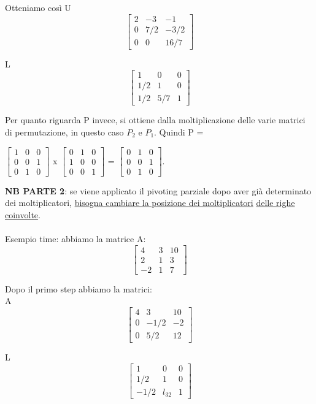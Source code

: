 Otteniamo così U 
$$
\begin{bmatrix}
2 & -3 & -1 \\
0 & 7/2 & -3/2 \\
0 & 0 & 16/7 
\end{bmatrix}
$$

L
$$
\begin{bmatrix}
1 & 0 & 0 \\
1/2 & 1 & 0 \\
1/2 & 5/7 & 1 
\end{bmatrix}
$$

Per quanto riguarda P invece, si ottiene dalla moltiplicazione delle varie matrici di permutazione, in questo caso $P_2$ e $P_1$. Quindi P = \\
\begin{center}
$
\begin{bmatrix}
1 & 0 & 0 \\
0 & 0 & 1 \\
0 & 1 & 0 
\end{bmatrix}
$
x
$
\begin{bmatrix}
0 & 1 & 0 \\
1 & 0 & 0 \\
0 & 0 & 1 
\end{bmatrix}
$
=
$
\begin{bmatrix}
0 & 1 & 0 \\
0 & 0 & 1 \\
0 & 1 & 0 
\end{bmatrix}
$.
\end{center}

\textbf{NB PARTE 2}: se viene applicato il pivoting parziale dopo aver già determinato dei moltiplicatori, \underline{bisogna cambiare la posizione dei moltiplicatori} \underline{delle righe coinvolte}.\\\\
Esempio time: abbiamo la matrice A:
$$
\begin{bmatrix}
4 & 3 & 10 \\
2 & 1 & 3 \\
-2 & 1 & 7
\end{bmatrix}
$$

Dopo il primo step abbiamo la matrici:\\
A
$$
\begin{bmatrix}
4 & 3 & 10 \\
0 & -1/2 & -2 \\
0 & 5/2 & 12 
\end{bmatrix}
$$

L
$$
\begin{bmatrix}
1 & 0 & 0 \\
1/2 & 1 & 0 \\
- 1/2 & l_{32} & 1 
\end{bmatrix}
$$

